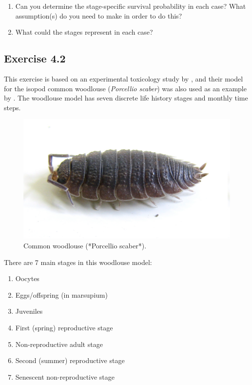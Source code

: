 \documentclass[
]{book}
\providecommand{\tightlist}{%
  \setlength{\itemsep}{0pt}\setlength{\parskip}{0pt}}
\begin{document}
\begin{enumerate}
\def\labelenumi{\arabic{enumi}.}
\setcounter{enumi}{1}
\item
  Can you determine the stage-specific survival probability in each case? What assumption(s) do you need to make in order to do this?
\item
  What could the stages represent in each case?
\end{enumerate}

\hypertarget{exercise-4.2}{%
\subsection*{Exercise 4.2}\label{exercise-4.2}}

This exercise is based on an experimental toxicology study by \citet{Kammenga1}, and their model for the isopod common woodlouse (\emph{Porcellio scaber}) was also used as an example by \citet{Vindenes2020}. The woodlouse model has seven discrete life history stages and monthly time steps.

\begin{figure}
\includegraphics[width=0.4\linewidth]{Porcellio_scaber} \caption{Common woodlouse (*Porcellio scaber*).}\label{fig:Porcellio1}
\end{figure}

There are 7 main stages in this woodlouse model:

\begin{enumerate}
\def\labelenumi{\arabic{enumi}.}
\tightlist
\item
  Oocytes\\
\item
  Eggs/offspring (in marsupium)\\
\item
  Juveniles\\
\item
  First (spring) reproductive stage\\
\item
  Non-reproductive adult stage\\
\item
  Second (summer) reproductive stage\\
\item
  Senescent non-reproductive stage
\end{enumerate}
\end{document}
